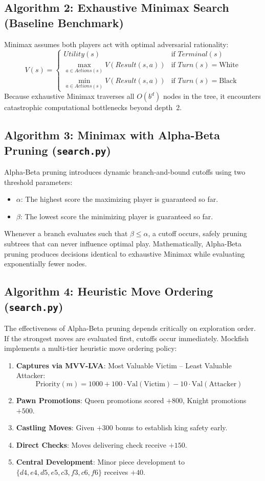 \documentclass[11pt,a4paper]{article}
\begin{document}
\subsection{Algorithm 2: Exhaustive Minimax Search (Baseline Benchmark)}
Minimax assumes both players act with optimal adversarial rationality:
$$V(s) = \begin{cases}
Utility(s) & \text{if } Terminal(s) \\
\max_{a \in Actions(s)} V(Result(s, a)) & \text{if } Turn(s) = \text{White} \\
\min_{a \in Actions(s)} V(Result(s, a)) & \text{if } Turn(s) = \text{Black}
\end{cases}$$
Because exhaustive Minimax traverses all $O(b^d)$ nodes in the tree, it encounters catastrophic computational bottlenecks beyond depth~2.

\subsection{Algorithm 3: Minimax with Alpha-Beta Pruning (\texttt{search.py})}
Alpha-Beta pruning introduces dynamic branch-and-bound cutoffs using two threshold parameters:
\begin{itemize}[leftmargin=*]
    \item $\alpha$: The highest score the maximizing player is guaranteed so far.
    \item $\beta$: The lowest score the minimizing player is guaranteed so far.
\end{itemize}
Whenever a branch evaluates such that $\beta \le \alpha$, a cutoff occurs, safely pruning subtrees that can never influence optimal play. Mathematically, Alpha-Beta pruning produces decisions identical to exhaustive Minimax while evaluating exponentially fewer nodes.

\subsection{Algorithm 4: Heuristic Move Ordering (\texttt{search.py})}
The effectiveness of Alpha-Beta pruning depends critically on exploration order. If the strongest moves are evaluated first, cutoffs occur immediately. Mockfish implements a multi-tier heuristic move ordering policy:
\begin{enumerate}[leftmargin=*]
    \item \textbf{Captures via MVV-LVA}: Most Valuable Victim -- Least Valuable Attacker:
    $$\text{Priority}(m) = 1000 + 100 \cdot \text{Val}(\text{Victim}) - 10 \cdot \text{Val}(\text{Attacker})$$
    \item \textbf{Pawn Promotions}: Queen promotions scored $+800$, Knight promotions $+500$.
    \item \textbf{Castling Moves}: Given $+300$ bonus to establish king safety early.
    \item \textbf{Direct Checks}: Moves delivering check receive $+150$.
    \item \textbf{Central Development}: Minor piece development to $\{d4, e4, d5, e5, c3, f3, c6, f6\}$ receives $+40$.
\end{enumerate}
\end{document}
